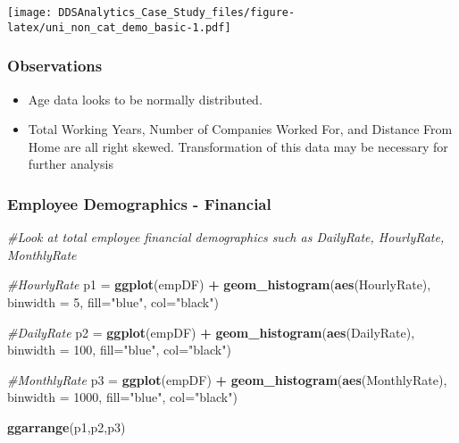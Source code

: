 \documentclass[]{article}
\newenvironment{Shaded}{\begin{snugshade}}{\end{snugshade}}
\newcommand{\KeywordTok}[1]{\textcolor[rgb]{0.13,0.29,0.53}{\textbf{#1}}}
\newcommand{\DataTypeTok}[1]{\textcolor[rgb]{0.13,0.29,0.53}{#1}}
\newcommand{\DecValTok}[1]{\textcolor[rgb]{0.00,0.00,0.81}{#1}}
\newcommand{\StringTok}[1]{\textcolor[rgb]{0.31,0.60,0.02}{#1}}
\newcommand{\CommentTok}[1]{\textcolor[rgb]{0.56,0.35,0.01}{\textit{#1}}}
\newcommand{\OperatorTok}[1]{\textcolor[rgb]{0.81,0.36,0.00}{\textbf{#1}}}
\newcommand{\NormalTok}[1]{#1}
\providecommand{\tightlist}{%
  \setlength{\itemsep}{0pt}\setlength{\parskip}{0pt}}
\begin{document}
\texttt{[image: DDSAnalytics\_Case\_Study\_files/figure-latex/uni\_non\_cat\_demo\_basic-1.pdf]}

\subsubsection{Observations}\label{observations}

\begin{itemize}
\tightlist
\item
  Age data looks to be normally distributed.
\item
  Total Working Years, Number of Companies Worked For, and Distance From
  Home are all right skewed. Transformation of this data may be
  necessary for further analysis
\end{itemize}

\subsubsection{Employee Demographics -
Financial}\label{employee-demographics---financial}

\begin{Shaded}
\begin{Highlighting}[]
\CommentTok{#Look at total employee financial demographics such as DailyRate, HourlyRate, MonthlyRate}

\CommentTok{#HourlyRate}
\NormalTok{p1 =}\StringTok{ }\KeywordTok{ggplot}\NormalTok{(empDF) }\OperatorTok{+}\StringTok{ }\KeywordTok{geom_histogram}\NormalTok{(}\KeywordTok{aes}\NormalTok{(HourlyRate), }\DataTypeTok{binwidth =} \DecValTok{5}\NormalTok{, }\DataTypeTok{fill=}\StringTok{"blue"}\NormalTok{, }\DataTypeTok{col=}\StringTok{"black"}\NormalTok{)}

\CommentTok{#DailyRate}
\NormalTok{p2 =}\StringTok{ }\KeywordTok{ggplot}\NormalTok{(empDF) }\OperatorTok{+}\StringTok{ }\KeywordTok{geom_histogram}\NormalTok{(}\KeywordTok{aes}\NormalTok{(DailyRate), }\DataTypeTok{binwidth =} \DecValTok{100}\NormalTok{, }\DataTypeTok{fill=}\StringTok{"blue"}\NormalTok{, }\DataTypeTok{col=}\StringTok{"black"}\NormalTok{)}

\CommentTok{#MonthlyRate}
\NormalTok{p3 =}\StringTok{ }\KeywordTok{ggplot}\NormalTok{(empDF) }\OperatorTok{+}\StringTok{ }\KeywordTok{geom_histogram}\NormalTok{(}\KeywordTok{aes}\NormalTok{(MonthlyRate), }\DataTypeTok{binwidth =} \DecValTok{1000}\NormalTok{, }\DataTypeTok{fill=}\StringTok{"blue"}\NormalTok{, }\DataTypeTok{col=}\StringTok{"black"}\NormalTok{)}

\KeywordTok{ggarrange}\NormalTok{(p1,p2,p3)}
\end{Highlighting}
\end{Shaded}
\end{document}
